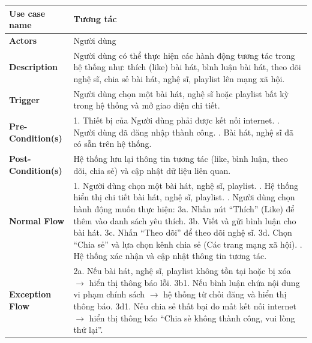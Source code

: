 \documentclass[a4paper]{article}
\newcommand{\cach}{\hspace*{1.5em}\ignorespaces}
\begin{document}
\begin{table}[h!]
\centering
\renewcommand{\arraystretch}{1.3} %
\begin{tabularx}{\textwidth}{|l|X|}
\hline
\textbf{Use case name} & Tương tác \\ \hline
\textbf{Actors}        & Người dùng \\ \hline
\textbf{Description}   & Người dùng có thể thực hiện các hành động tương tác trong hệ thống như: thích (like) bài hát, bình luận bài hát, theo dõi nghệ sĩ, chia sẻ bài hát, nghệ sĩ, playlist lên mạng xã hội. \\ \hline
\textbf{Trigger}       & Người dùng chọn một bài hát, nghệ sĩ hoặc playlist bất kỳ trong hệ thống và mở giao diện chi tiết. \\ \hline
\textbf{Pre-Condition(s)} 
& 1. Thiết bị của Người dùng phải được kết nối internet. \newline
  2. Người dùng đã đăng nhập thành công. \newline
  3. Bài hát, nghệ sĩ đã có sẵn trên hệ thống. \\ \hline
\textbf{Post-Condition(s)} 
& Hệ thống lưu lại thông tin tương tác (like, bình luận, theo dõi, chia sẻ) và cập nhật dữ liệu liên quan. \\ \hline
\textbf{Normal Flow}   
& 1. Người dùng chọn một bài hát, nghệ sĩ, playlist. \newline
  2. Hệ thống hiển thị chi tiết bài hát, nghệ sĩ, playlist. \newline
  3. Người dùng chọn hành động muốn thực hiện: \newline
  \cach 3a. Nhấn nút “Thích” (Like) để thêm vào danh sách yêu thích. \newline
  \cach 3b. Viết và gửi bình luận cho bài hát. \newline
  \cach 3c. Nhấn “Theo dõi” để theo dõi nghệ sĩ. \newline
  \cach 3d. Chọn “Chia sẻ” và lựa chọn kênh chia sẻ (Các trang mạng xã \cach hội). \newline
  4. Hệ thống xác nhận và cập nhật thông tin tương tác. \\ \hline
\textbf{Exception Flow} 
& 2a. Nếu bài hát, nghệ sĩ, playlist không tồn tại hoặc bị xóa $\rightarrow$ hiển thị thông báo lỗi. \newline
  3b1. Nếu bình luận chứa nội dung vi phạm chính sách $\rightarrow$ hệ thống từ chối đăng và hiển thị thông báo. \newline
  3d1. Nếu chia sẻ thất bại do mất kết nối internet $\rightarrow$ hiển thị thông báo “Chia sẻ không thành công, vui lòng thử lại”. \\ \hline

\end{tabularx}
\end{table}
\end{document}
